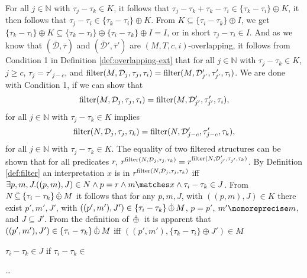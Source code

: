 For all $j \in \mathbb{N}$ with $\tau_j - \tau_k \in K$,
    it follows that $\tau_j - \tau_k + \tau_k - \tau_i \in \{\tau_k - \tau_i \} \oplus K$,
    it then follows that $\tau_j - \tau_i \in \{\tau_k - \tau_i\} \oplus K$. 
From $K \subseteq \{ \tau_i - \tau_k \} \oplus I$,
    we get $\{\tau_k - \tau_i\} \oplus K \subseteq \{\tau_k - \tau_i \} \oplus \{\tau_i - \tau_k \} \oplus I = I$,
    or in short $\tau_j - \tau_i \in I$.
And as we know that $(\bar{\mathcal{D}}, \bar{\tau})$
    and $(\bar{\mathcal{D}}', \bar{\tau}')$ are $(M,T,c,i)$-overlapping,
    it follows from Condition 1 in Definition \ref{def:overlapping-ext} that
    for all $j \in \mathbb{N}$ with $\tau_j - \tau_k \in K$,
    $j \geq c$, $\tau_j = \tau'_{j-c}$,
    and $\operatorname{filter}(M, \mathcal{D}_j, \tau_j, \tau_i) = \operatorname{filter}(M, \mathcal{D}'_{j'}, \tau'_{j'}, \tau_i)$.
We are done with Condition 1, if we can show that
\begin{equation*}
    \operatorname{filter}(M, \mathcal{D}_j, \tau_j, \tau_i) = \operatorname{filter}(M, \mathcal{D}'_{j'}, \tau'_{j'}, \tau_i),
\end{equation*}
for all $j \in \mathbb{N}$ with $\tau_j - \tau_k \in K$ implies 
\begin{equation*}
    \operatorname{filter}(N, \mathcal{D}_j, \tau_j, \tau_k) 
    = \operatorname{filter}(N, \mathcal{D}'_{j-c}, \tau'_{j-c}, \tau_k),  
\end{equation*}
for all $j \in \mathbb{N}$ with $\tau_j - \tau_k \in K$.
The equality of two filtered structures can be shown that for all predicates $r$,
$r^{\operatorname{filter}(N, \mathcal{D}_j, \tau_j, \tau_k)} = r^{\operatorname{filter}(N, \mathcal{D}'_{j'}, \tau_{j'}, \tau_k)}$.
By Definition \ref{def:filter} an interpretation $x$ is in $r^{\operatorname{filter}(N, \mathcal{D}_j, \tau_j, \tau_k)}$ iff $\exists p,m,J . ((p,m), J) \in N \land p = r \land m \matches x \land \tau_i - \tau_k \in J$.
From $N \,\ddot{\subseteq}\, \{ \tau_i - \tau_k \} \,\dot{\oplus}\, M$ it follows that for any $p,m,J$, with $((p,m), J) \in K$ there exist $p',m',J'$,
    with $((p',m'), J') \in \{\tau_i - \tau_k \} \,\dot{\oplus}\, M$,
    $p=p'$,
    $m' \nomoreprecise m$,
    and $J \subseteq J'$.
From the definition of $\,\dot{\oplus}\,$ it is apparent that
$((p',m'), J') \in \{\tau_i - \tau_k \} \,\dot{\oplus}\, M$
iff
$((p',m'), \{\tau_k - \tau_i\} \oplus J') \in M$ 

$\tau_i - \tau_k \in J$ if $\tau_i - \tau_k \in $


\dots